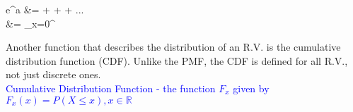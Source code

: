 \documentclass[12pt]{article}
\newcommand{\ddef}[1]{\textcolor{blue}{#1}}
\newcommand{\real}[0]{\mathbb{R}}
\newenvironment{eqn}{\equation\alignedat{3}}{\endalignedat\endequation}
\begin{document}
\begin{eqn}
	e^a &=  +  +  + ... \\
	&= \sum_{x=0}^\infty {}
\end{eqn}

Another function that describes the distribution of an R.V. is the cumulative distribution function (CDF). Unlike the PMF, the CDF is defined for all R.V., not just discrete ones. \\

\ddef{Cumulative Distribution Function - the function $F_x$ given by $F_x(x) = P(X \le x), x \in \real$}
\end{document}
